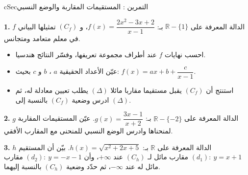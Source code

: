 \documentclass[12pt,a4paper]{article}
\newenvironment{BOX}[2]{\begin{otherlanguage}{english}\begin{arbox}{#1}{#2}}{\end{arbox}\end{otherlanguage}}
\newcounter{exo}
\newenvironment{tamrin}[1]{\stepcounter{exo}\begin{BOX}{cSec}{التمرين \theexo: #1}}{\end{BOX}}
\newcommand{\R}{\mathbb{R}}
\newenvironment{sq}{\begin{itemize}[leftmargin=2.4em,itemsep=3pt]}{\end{itemize}}
\newcommand{\qa}{\item[(أ)]}\newcommand{\qb}{\item[(ب)]}\newcommand{\qc}{\item[(جـ)]}\newcommand{\qd}{\item[(د)]}\newcommand{\qe}{\item[(هـ)]}
\newcommand{\QQ}[1]{\par\smallskip\textbf{#1.} }
\begin{document}
\begin{tamrin}{المستقيمات المقاربة والوضع النسبي}
\QQ{1} $f$ الدالة المعرفة على $\R-\{1\}$ بـ: $f(x)=\dfrac{2x^{2}-3x+2}{x-1}$، و $(C_f)$ تمثيلها البياني في معلم متعامد ومتجانس.
\begin{sq}
\qa احسب نهايات $f$ عند أطراف مجموعة تعريفها، وفسّر النتائج هندسيا.
\qb عيّن الأعداد الحقيقية $a$ ، $b$ و $c$ بحيث: $f(x)=ax+b+\dfrac{c}{x-1}$.
\qc استنتج أن $(C_f)$ يقبل مستقيما مقاربا مائلا $(\Delta)$ يطلب تعيين معادلة له، ثم ادرس وضعية $(C_f)$ بالنسبة إلى $(\Delta)$.
\end{sq}
\QQ{2} $g$ الدالة المعرفة على $\R-\{-2\}$ بـ: $g(x)=\dfrac{3x-1}{x+2}$. عيّن المستقيمات المقاربة لمنحناها وادرس الوضع النسبي للمنحنى مع المقارب الأفقي.
\QQ{3} $h$ الدالة المعرفة على $\R$ بـ: $h(x)=\sqrt{x^{2}+2x+5}$. بيّن أن المستقيم $(d_1):\ y=x+1$ مقارب مائل لـ $(C_h)$ عند $+\infty$، وأن $(d_2):\ y=-x-1$ مقارب مائل له عند $-\infty$، ثم حدّد وضعية $(C_h)$ بالنسبة إليهما.
\end{tamrin}
\end{document}

